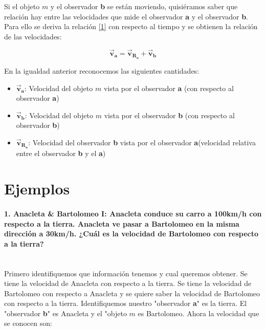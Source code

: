\documentclass[a4paper,11pt]{article}
\theoremstyle{mytheor}
\begin{document}
Si el objeto $m$ y el observador \textbf{b} se están moviendo, quisiéramos saber que relación hay entre las velocidades que mide el observador \textbf{a} y el observador \textbf{b}. Para ello se deriva la relación \ref{1} con respecto al tiempo y se obtienen la relación de las velocidades:

\begin{equation}\label{2}
\vec{\textbf{v}}_{\textbf{a}} = \vec{\textbf{v}}_{\textbf{R}_\textbf{a}} + \vec{\textbf{v}}_{\textbf{b}}
\end{equation}

En la igualdad anterior reconocemos las siguientes cantidades:

\begin{itemize}
\item $\vec{\textbf{v}}_{\textbf{a}}$: Velocidad del objeto $m$ vista por el observador \textbf{a} (con respecto al observador \textbf{a})
\item $\vec{\textbf{v}}_{\textbf{b}}$: Velocidad del objeto $m$ vista por el observador \textbf{b} (con respecto al observador \textbf{b})
\item $\vec{\textbf{v}}_{\textbf{R}_\textbf{a}}$: Velocidad del observador \textbf{b} vista por el observador \textbf{a}(velocidad relativa entre el observador \textbf{b} y el \textbf{a})
\end{itemize}

\section{Ejemplos}

\paragraph{1. Anacleta \& Bartolomeo I: Anacleta conduce su carro a 100km/h con respecto a la tierra. Anacleta ve pasar a Bartolomeo en la misma dirección  a 30km/h. ¿Cuál es la velocidad de Bartolomeo con respecto a la tierra?\\
\\	}



Primero identifiquemos que información tenemos y cual queremos obtener. Se tiene la velocidad de Anacleta con respecto a la tierra. Se tiene la velocidad de Bartolomeo con respecto a Anacleta y se quiere saber la velocidad de Bartolomeo con respecto a la tierra. Identifiquemos nuestro "observador \textbf{a}" es la tierra. El "observador \textbf{b}" es Anacleta y el "objeto $m$ es Bartolomeo. Ahora la velocidad que se conocen son:
\end{document}
